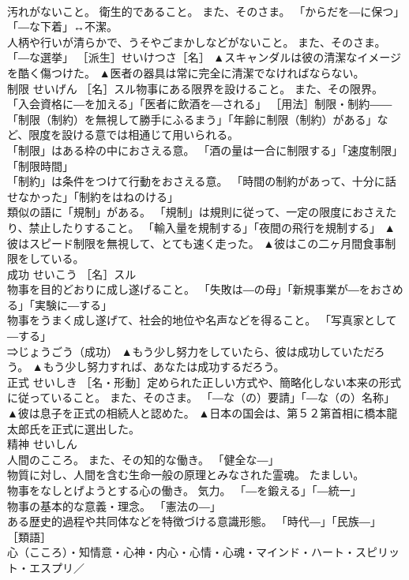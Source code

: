 \documentclass[8pt]{extreport}
\begin{document}
\begin{CJK}{UTF8}{min}
\\	汚れがないこと。 衛生的であること。 また、そのさま。 「からだを―に保つ」「―な下着」↔不潔。 
\\	人柄や行いが清らかで、うそやごまかしなどがないこと。 また、そのさま。 「―な選挙」 ［派生］せいけつさ［名］	▲スキャンダルは彼の清潔なイメージを酷く傷つけた。 ▲医者の器具は常に完全に清潔でなければならない。
\\	制限	せいげん	［名］スル物事にある限界を設けること。 また、その限界。 「入会資格に―を加える」「医者に飲酒を―される」 ［用法］制限・制約――「制限（制約）を無視して勝手にふるまう」「年齢に制限（制約）がある」など、限度を設ける意では相通じて用いられる。 
\\	「制限」はある枠の中におさえる意。 「酒の量は一合に制限する」「速度制限」「制限時間」
\\	「制約」は条件をつけて行動をおさえる意。 「時間の制約があって、十分に話せなかった」「制約をはねのける」
\\	類似の語に「規制」がある。 「規制」は規則に従って、一定の限度におさえたり、禁止したりすること。 「輸入量を規制する」「夜間の飛行を規制する」	▲彼はスピード制限を無視して、とても速く走った。 ▲彼はこの二ヶ月間食事制限をしている。
\\	成功	せいこう	［名］スル 
\\	物事を目的どおりに成し遂げること。 「失敗は―の母」「新規事業が―をおさめる」「実験に―する」 
\\	物事をうまく成し遂げて、社会的地位や名声などを得ること。 「写真家として―する」 
\\	⇒じょうごう（成功）	▲もう少し努力をしていたら、彼は成功していただろう。 ▲もう少し努力すれば、あなたは成功するだろう。
\\	正式	せいしき	［名・形動］定められた正しい方式や、簡略化しない本来の形式に従っていること。 また、そのさま。 「―な（の）要請」「―な（の）名称」	▲彼は息子を正式の相続人と認めた。 ▲日本の国会は、第５２第首相に橋本龍太郎氏を正式に選出した。
\\	精神	せいしん	
\\	人間のこころ。 また、その知的な働き。 「健全な―」 
\\	物質に対し、人間を含む生命一般の原理とみなされた霊魂。 たましい。 
\\	物事をなしとげようとする心の働き。 気力。 「―を鍛える」「―統一」 
\\	物事の基本的な意義・理念。 「憲法の―」 
\\	ある歴史的過程や共同体などを特徴づける意識形態。 「時代―」「民族―」 ［類語］
\\	心（こころ）・知情意・心神・内心・心情・心魂・マインド・ハート・スピリット・エスプリ／

\end{CJK}
\end{document}
